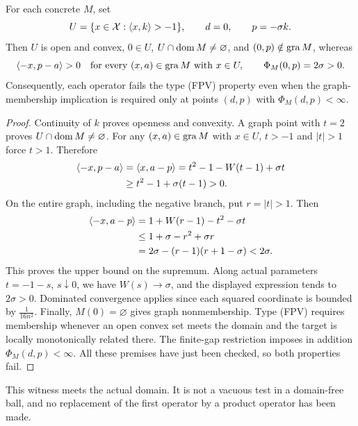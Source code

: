 \begin{corollary}\label{cor:fpv}
For each concrete $M$, set
\begin{equation}
U=\{x\in\mathcal X:\langle x,k\rangle>-1\},\qquad
d=0,\qquad p=-\sigma k.
\label{eq:cor-FPV-witness}
\end{equation}
Then $U$ is open and convex, $0\in U$, $U\cap\operatorname{dom} M\ne\varnothing$,
and $(0,p)\notin\operatorname{gra} M$, whereas
\begin{equation}
\langle -x,p-a\rangle>0
\quad\text{for every }(x,a)\in\operatorname{gra} M\text{ with }x\in U,
\qquad
\Phi_M(0,p)=2\sigma>0.
\label{eq:cor-FPV-checks}
\end{equation}
Consequently, each operator fails the type (FPV) property even when the
graph-membership implication is required only at points $(d,p)$ with
$\Phi_M(d,p)<\infty$.
\end{corollary}
\begin{proof}
Continuity of $k$ proves openness and convexity. A graph point with
$t=2$ proves $U\cap\operatorname{dom} M\ne\varnothing$. For any $(x,a)\in\operatorname{gra} M$ with $x\in U$,
$t>-1$ and $|t|>1$ force $t>1$. Therefore
\begin{align*}
\langle -x,p-a\rangle
&=\langle x,a-p\rangle=t^2-1-W(t-1)+\sigma t\\
&\ge t^2-1+\sigma(t-1)>0.
\end{align*}
On the entire graph, including the negative branch, put $r=|t|>1$.
Then
\begin{align*}
\langle -x,a-p\rangle
&=1+W(r-1)-t^2-\sigma t\\
&\le1+\sigma-r^2+\sigma r\\
&=2\sigma-(r-1)(r+1-\sigma)<2\sigma.
\end{align*}
This proves the upper bound on the supremum. Along actual parameters
$t=-1-s$, $s\downarrow0$, we have $W(s)\to\sigma$, and the displayed
expression tends to $2\sigma>0$. Dominated convergence applies since
each squared coordinate is bounded by $\frac{1}{16n^2}$.
Finally, $M(0)=\varnothing$ gives graph nonmembership. Type (FPV)
requires membership whenever an open convex set meets the domain and
the target is locally monotonically related there. The finite-gap
restriction imposes in addition $\Phi_M(d,p)<\infty$. All these premises
have just been checked, so both properties fail.
\end{proof}
This witness meets the actual domain. It is not a vacuous test in a
domain-free ball, and no replacement of the first operator by a product
operator has been made.


